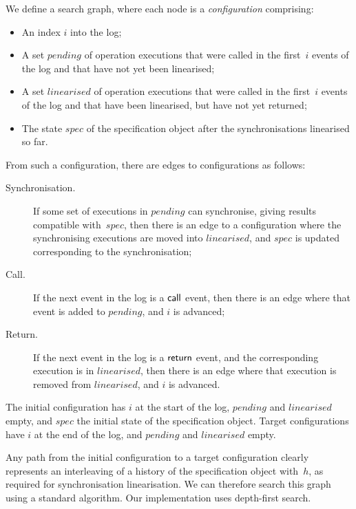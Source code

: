 We define a search graph, where each node is a \emph{configuration}
comprising:
%
\begin{itemize}
\item An index $i$ into the log;

\item A set $pending$ of operation executions that were called in the
  first~$i$ events of the log and that have not yet been linearised;

\item A set $linearised$ of operation executions that were called in the
  first~$i$ events of the log and that have been linearised, but have not yet
  returned;

\item The state $spec$ of the specification object after the synchronisations
  linearised so far.
\end{itemize}
%
From such a configuration, there are edges to configurations as follows:
%
\def\edgeFont#1{\rm\textsf{#1}}
\begin{description}
\item[\edgeFont{Synchronisation}.] If some set of executions in $pending$ can
  synchronise, giving results compatible with~$spec$, then there is an edge to
  a configuration where the synchronising executions are moved into
  $linearised$, and $spec$ is updated corresponding to the synchronisation;

\item[\edgeFont{Call}.] If the next event in the log is a $\mathsf{call}$ event, then
  there is an edge where that event is added to $pending$, and $i$ is
  advanced;

\item[\edgeFont{Return}.] If the next event in the log is a $\mathsf{return}$ event,
  and the corresponding execution is in $linearised$, then there is an edge
  where that execution is removed from $linearised$, and $i$ is advanced.
\end{description}
%
The initial configuration has $i$ at the start of the log, $pending$ and
$linearised$ empty, and $spec$ the initial state of the specification object.
Target configurations have $i$ at the end of the log, and $pending$ and
$linearised$ empty.

Any path from the initial configuration to a target configuration clearly
represents an interleaving of a history of the specification object with~$h$,
as required for synchronisation linearisation.  We can therefore search this
graph using a standard algorithm.  Our implementation uses depth-first search.

